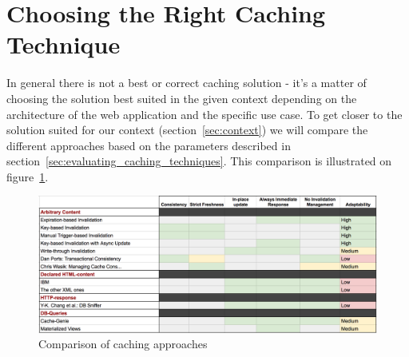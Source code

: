 %
%


\section{Choosing the Right Caching Technique}
\label{sec:choosing_the_right_caching_technique}

In general there is not a best or correct caching solution - it's a matter of choosing the solution best suited in the given context depending on the architecture of the web application and the specific use case. To get closer to the solution suited for our context (section~\ref{sec:context}) we will compare the different approaches based on the parameters described in section~\ref{sec:evaluating_caching_techniques}. This comparison is illustrated on figure~\ref{fig:existing-solutions-comparison}.

\begin{figure}[ht!]
  \centering
  \includegraphics[width=1.0\linewidth]{figures/existing-solutions-comparison.png}
  \caption{Comparison of caching approaches}
  \label{fig:existing-solutions-comparison}
\end{figure}

